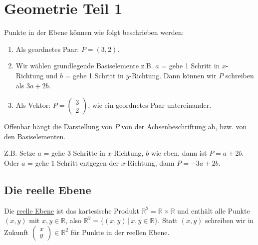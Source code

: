 \setcounter{MathCounter}{0}
\section{Geometrie Teil 1}
\begin{center}
\end{center}

Punkte in der Ebene können wie folgt beschrieben werden:
\begin{enumerate}
	\item{Als geordnetes Paar: $P = (3, 2)$.}
	\item{Wir wählen \glqq{}grundlegende Basiselemente\grqq{} z.B. $a$ = \glqq{}gehe\grqq{} 1 Schritt in $x$-Richtung und $b$ = \glqq{}gehe\grqq{} 1 Schritt in $y$-Richtung. Dann können wir $P$ schreiben als $3a + 2b$.}
	\item{Als Vektor: $P = \begin{pmatrix}3 \\ 2\end{pmatrix}$, wie ein geordnetes Paar untereinander.}
\end{enumerate}

Offenbar hängt die Darstellung von $P$ von der Achsenbeschriftung ab, bzw. von den \glqq{}Basiselementen\grqq{}.

Z.B. Setze $a$ = \glqq{}gehe\grqq{} 3 Schritte in $x$-Richtung, $b$ wie eben, dann ist $P = a + 2b$. Oder $a$ = \glqq{}gehe\grqq{} 1 Schritt entgegen der $x$-Richtung, dann $P = -3a + 2b$.

\subsection{Die reelle Ebene}
Die \underline{reelle Ebene} ist das kartesische Produkt $\mathbb{R}^2 = \mathbb{R} \times \mathbb{R}$ und enthält alle Punkte $(x, y)$ mit $x, y \in \mathbb{R}$, also $\mathbb{R}^2 = \{(x,y)\,|\,x,y \in \mathbb{R}\}$. Statt $(x, y)$ schreiben wir in Zukunft $\begin{pmatrix}x \\ y\end{pmatrix} \in \mathbb{R}^2$ für Punkte in der reellen Ebene.

